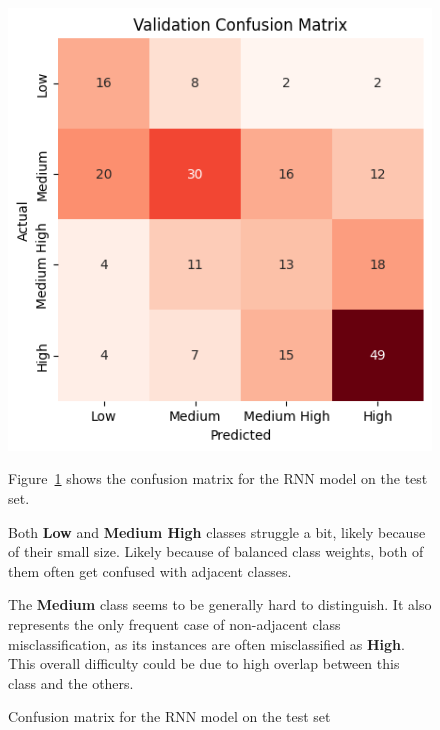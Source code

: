 \begin{figure}[H]
    \centering
    \begin{minipage}{0.41\textwidth}
        \includegraphics[width=1\textwidth]{plotsss/rnn_cm.png}
        \caption{Confusion matrix for the RNN model on the test set}
        \label{fig:cm_rnn}
    \end{minipage}
    \hfill
    \begin{minipage}{0.55\textwidth}
        Figure~\ref{fig:cm_rnn} shows the confusion matrix for the RNN
        model on the test set.

        Both \textbf{Low} and \textbf{Medium High} classes struggle
        a bit, likely because of their small size.
        Likely because of balanced class weights, both of them
        often get confused with adjacent classes.

        The \textbf{Medium} class seems to be generally hard to
        distinguish.
        It also represents the only frequent case of non-adjacent
        class misclassification, as its instances are often
        misclassified as \textbf{High}.
        This overall difficulty could be due to high overlap between
        this class and the others.
    \end{minipage}
\end{figure}

